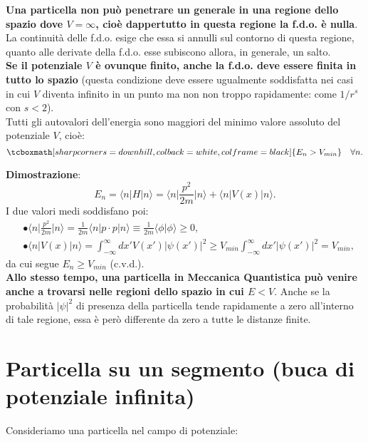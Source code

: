 \documentclass[a4paper,12pt,oneside]{book}
\begin{document}
\textbf{Una particella non può penetrare un generale in una regione dello spazio dove $V =\infty$, cioè dappertutto in questa regione la f.d.o. è nulla}. La continuità delle f.d.o. esige che essa si annulli sul contorno di questa regione, quanto alle derivate della f.d.o. esse subiscono allora, in generale, un salto.\\

\textbf{Se il potenziale $V$ è ovunque finito, anche la f.d.o. deve essere finita in tutto lo spazio} (questa condizione deve essere ugualmente soddisfatta nei casi in cui $V$ diventa infinito in un punto ma non non troppo rapidamente: come $1/r^s$ con $s<2$).\\

Tutti gli autovalori dell'energia sono maggiori del minimo valore assoluto del potenziale $V$, cioè:
	\begin{equation}
		\tcboxmath[sharp corners=downhill, colback=white, colframe=black]{
			E_n >V_{min} 
			}\quad \forall n.
	\end{equation}
	
\textbf{Dimostrazione}:
	\begin{equation}
		E_n = \langle n \vert H \vert n \rangle =  \langle n \vert \frac{p ^2}{2m} \vert n \rangle + \langle n \vert V(x) \vert n \rangle .
	\end{equation}
I due  valori medi soddisfano poi:
	\begin{align}
		&\bullet \langle n \vert \frac{p ^2}{2m} \vert n \rangle =\frac{1}{2m} \langle n \vert p\cdot p\vert n \rangle \equiv \frac{1}{2m} \langle \phi \vert  \phi \rangle \ge 0 , \\[0.3cm]
		&\bullet \langle n \vert V(x) \vert n \rangle = \int _{-\infty} ^{\infty} dx' V(x') \vert \psi (x') \vert ^2 \geq V_{min} \int _{-\infty} ^{\infty} dx'  \vert \psi (x') \vert ^2 = V_{min} , 
	\end{align}
da cui segue $E_n \geq V_{min}$ (c.v.d.).\\

\textbf{Allo stesso tempo, una particella in Meccanica Quantistica può venire anche a trovarsi nelle regioni dello spazio in cui $E<V$}. Anche se la probabilità $|\psi|^2$ di presenza della particella tende rapidamente a zero all'interno di tale regione, essa è però differente da zero a tutte le distanze finite.
\section{Particella su un segmento (buca di potenziale infinita)}
Consideriamo una particella nel campo di potenziale:\\
\end{document}
